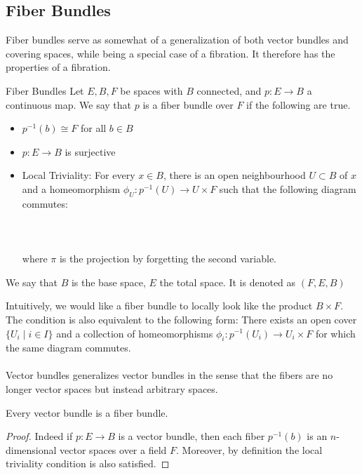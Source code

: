 \documentclass[a4paper]{article}
\begin{document}
\subsection{Fiber Bundles}
Fiber bundles serve as somewhat of a generalization of both vector bundles and covering spaces, while being a special case of a fibration. It therefore has the properties of a fibration. 

\begin{defn}{Fiber Bundles}{} Let $E,B,F$ be spaces with $B$ connected, and $p:E\to B$ a continuous map. We say that $p$ is a fiber bundle over $F$ if the following are true. 
\begin{itemize}
\item $p^{-1}(b)\cong F$ for all $b\in B$
\item $p:E\to B$ is surjective
\item Local Triviality: For every $x\in B$, there is an open neighbourhood $U\subset B$ of $x$ and a homeomorphism $\phi_U:p^{-1}(U)\to U\times F$ such that the following diagram commutes: \\~\\
\\~\\
where $\pi$ is the projection by forgetting the second variable. 
\end{itemize}
We say that $B$ is the base space, $E$ the total space. It is denoted as $(F,E,B)$
\end{defn}

Intuitively, we would like a fiber bundle to locally look like the product $B\times F$. The condition is also equivalent to the following form: There exists an open cover $\{U_i\;|\;i\in I\}$ and a collection of homeomorphisms $\phi_i:p^{-1}(U_i)\to U_i\times F$ for which the same diagram commutes. \\~\\

Vector bundles generalizes vector bundles in the sense that the fibers are no longer vector spaces but instead arbitrary spaces. 

\begin{lmm}{}{} Every vector bundle is a fiber bundle. \tcbline
\begin{proof}
Indeed if $p:E\to B$ is a vector bundle, then each fiber $p^{-1}(b)$ is an $n$-dimensional vector spaces over a field $F$. Moreover, by definition the local triviality condition is also satisfied. 
\end{proof}
\end{lmm}
\end{document}
